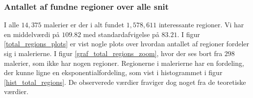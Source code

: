 {\subsubsection{Antallet af fundne regioner over alle snit}
I alle $14,375$ malerier er der i alt fundet $1,578,611$ interessante
regioner. Vi har en middelværdi på $109.82$ med standardafvigelse på
$83.21$. I figur \ref{total_regions_plots} er vist nogle plots over
hvordan antallet af regioner fordeler sig i malerierne.  I figur
\ref{graf_total_regions_zoom}, hvor der ses bort fra $298$ malerier, som
ikke har nogen regioner. Regionerne i malerierne har en fordeling, der
kunne ligne en eksponentialfordeling, som vist i histogrammet i figur
\ref{hist_total_regions}. De observerede værdier fraviger dog noget fra
de teoretiske værdier.

\begin{figure}[!h]
    \centering
    \\
    \subfloat[]{
}
\end{figure}}
